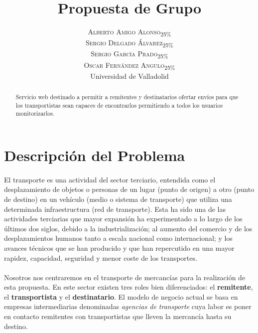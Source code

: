 \documentclass[10pt, a4paper,spanish]{article}
\title{\vspace{-15mm}\fontsize{24pt}{10pt}\selectfont\textbf{Propuesta de Grupo}} %
\author{
\large
\textsc{Alberto Amigo Alonso\textsubscript{25\%}}\\[2mm] %
\textsc{Sergio Delgado Álvarez\textsubscript{25\%}}\\[2mm] %
\textsc{Sergio García Prado\textsubscript{25\%}}\\[2mm] %
\textsc{Oscar Fernández Angulo\textsubscript{25\%}}\\[2mm] %
\normalsize Universidad de Valladolid \\ %
\vspace{-5mm}
}
\date{}
\begin{document}
	\maketitle %

	\thispagestyle{fancy} %


	\begin{abstract}
		\noindent Servicio web destinado a permitir a remitentes y destinatarios ofertar envíos para que los transportistas sean capaces de encontrarlos permitiendo a todos los usuarios monitorizarlos.
	\end{abstract}


		\section{Descripción del Problema}

			\paragraph{}
			El transporte es una actividad del sector terciario, entendida como el desplazamiento de objetos o personas de un lugar (punto de origen) a otro (punto de destino) en un vehículo (medio o sistema de transporte) que utiliza una determinada infraestructura (red de transporte). Esta ha sido una de las actividades terciarias que mayor expansión ha experimentado a lo largo de los últimos dos siglos, debido a la industrialización; al aumento del comercio y de los desplazamientos humanos tanto a escala nacional como internacional; y los avances técnicos que se han producido y que han repercutido en una mayor rapidez, capacidad, seguridad y menor coste de los transportes. \cite{wikipedia_transporte}

			\paragraph{}
			Nosotros nos centraremos en el transporte de mercancías para la realización de esta propuesta. En este sector existen tres roles bien diferenciados: el \textbf{remitente}, el \textbf{transportista} y el \textbf{destinatario}. El modelo de negocio actual se basa en empresas intermediarias denominadas \textit{agencias de transporte} cuya labor es poner en contacto remitentes con transportistas que lleven la mercancía hasta su destino.
\end{document}
